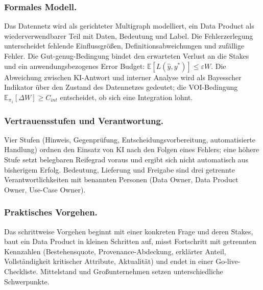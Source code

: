 \documentclass[a4paper,12pt,twoside]{report}
\theoremstyle{definition}
\newcommand{\E}{\mathbb{E}}
\begin{document}
\subsubsection{Formales Modell.}
Das Datennetz wird als gerichteter Multigraph modelliert, ein Data Product als wiederverwendbarer Teil mit Daten, Bedeutung und Label. Die Fehlerzerlegung unterscheidet fehlende Einflussgrößen, Definitionsabweichungen und zufällige Fehler. Die Gut-genug-Bedingung bindet den erwarteten Verlust an die Stakes und ein anwendungsbezogenes Error Budget: $\E[L(\hat y,y^*)]\le\varepsilon W$. Die Abweichung zwischen KI-Antwort und interner Analyse wird als Bayesscher Indikator über den Zustand des Datennetzes gedeutet; die VOI-Bedingung $\E_{\pi_1}[\Delta W]\ge C_{int}$ entscheidet, ob sich eine Integration lohnt.

\subsubsection{Vertrauensstufen und Verantwortung.}
Vier Stufen (Hinweis, Gegenprüfung, Entscheidungsvorbereitung, automatisierte Handlung) ordnen den Einsatz von KI nach den Folgen eines Fehlers; eine höhere Stufe setzt belegbaren Reifegrad voraus und ergibt sich nicht automatisch aus bisherigem Erfolg. Bedeutung, Lieferung und Freigabe sind drei getrennte Verantwortlichkeiten mit benannten Personen (Data Owner, Data Product Owner, Use-Case Owner).

\subsubsection{Praktisches Vorgehen.}
Das schrittweise Vorgehen beginnt mit einer konkreten Frage und deren Stakes, baut ein Data Product in kleinen Schritten auf, misst Fortschritt mit getrennten Kennzahlen (Bestehensquote, Provenance-Abdeckung, erklärter Anteil, Vollständigkeit kritischer Attribute, Aktualität) und endet in einer Go-live-Checkliste. Mittelstand und Großunternehmen setzen unterschiedliche Schwerpunkte.
\end{document}
